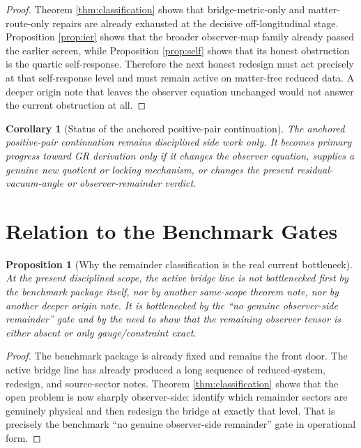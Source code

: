 \documentclass[11pt]{article}
\newtheorem{proposition}{Proposition}
\newtheorem{corollary}{Corollary}
\begin{document}
\begin{proof}
Theorem \ref{thm:classification} shows that bridge-metric-only and matter-route-only repairs are already exhausted at the decisive off-longitudinal stage. Proposition \ref{prop:ier} shows that the broader observer-map family already passed the earlier screen, while Proposition \ref{prop:self} shows that its honest obstruction is the quartic self-response. Therefore the next honest redesign must act precisely at that self-response level and must remain active on matter-free reduced data. A deeper origin note that leaves the observer equation unchanged would not answer the current obstruction at all.
\end{proof}

\begin{corollary}[Status of the anchored positive-pair continuation]
The anchored positive-pair continuation remains disciplined side work only. It becomes primary progress toward GR derivation only if it changes the observer equation, supplies a genuine new quotient or locking mechanism, or changes the present residual-vacuum-angle or observer-remainder verdict.
\end{corollary}

\section{Relation to the Benchmark Gates}

\begin{proposition}[Why the remainder classification is the real current bottleneck]
At the present disciplined scope, the active bridge line is not bottlenecked first by the benchmark package itself, nor by another same-scope theorem note, nor by another deeper origin note. It is bottlenecked by the ``no genuine observer-side remainder'' gate and by the need to show that the remaining observer tensor is either absent or only gauge/constraint exact.
\end{proposition}

\begin{proof}
The benchmark package is already fixed and remains the front door. The active bridge line has already produced a long sequence of reduced-system, redesign, and source-sector notes. Theorem \ref{thm:classification} shows that the open problem is now sharply observer-side: identify which remainder sectors are genuinely physical and then redesign the bridge at exactly that level. That is precisely the benchmark ``no genuine observer-side remainder'' gate in operational form.
\end{proof}
\end{document}
